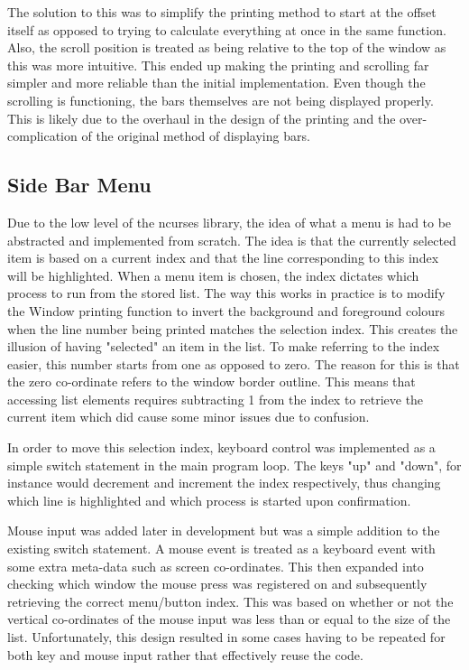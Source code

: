 The solution to this was to simplify the printing method to start at the offset itself as opposed to trying to calculate everything at once in the same function. Also, the scroll position is treated as being relative to the top of the window as this was more intuitive. This ended up making the printing and scrolling far simpler and more reliable than the initial implementation. Even though the scrolling is functioning, the bars themselves are not being displayed properly. This is likely due to the overhaul in the design of the printing and the over-complication of the original method of displaying bars.

\subsection{Side Bar Menu}
\label{sidebar_menu}

Due to the low level of the {\selectfont ncurses} library, the idea of what a menu is had to be abstracted and implemented from scratch. The idea is that the currently selected item is based on a current index and that the line corresponding to this index will be highlighted. When a menu item is chosen, the index dictates which process to run from the stored list. The way this works in practice is to modify the Window printing function to invert the background and foreground colours when the line number being printed matches the selection index. This creates the illusion of having "selected" an item in the list. To make referring to the index easier, this number starts from one as opposed to zero. The reason for this is that the zero co-ordinate refers to the window border outline. This means that accessing list elements requires subtracting 1 from the index to retrieve the current item which did cause some minor issues due to confusion.

In order to move this selection index, keyboard control was implemented as a simple switch statement in the main program loop. The keys "up" and "down", for instance would decrement and increment the index respectively, thus changing which line is highlighted and which process is started upon confirmation.

Mouse input was added later in development but was a simple addition to the existing switch statement. A mouse event is treated as a keyboard event with some extra meta-data such as screen co-ordinates. This then expanded into checking which window the mouse press was registered on and subsequently retrieving the correct menu/button index. This was based on whether or not the vertical co-ordinates of the mouse input was less than or equal to the size of the list. Unfortunately, this design resulted in some cases having to be repeated for both key and mouse input rather that effectively reuse the code.

